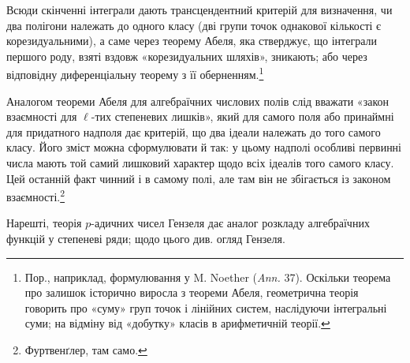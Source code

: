\documentclass[11pt]{article}
\begin{document}
Всюди скінченні інтеграли дають трансцендентний критерій для визначення, чи два полігони належать до одного класу (дві групи точок однакової кількості є корезидуальними), а саме через теорему Абеля, яка стверджує, що інтеграли першого роду, взяті вздовж «корезидуальних шляхів», зникають; або через відповідну диференціальну теорему з її оберненням.\footnote{Пор., наприклад, формулювання у M. Noether (\emph{Ann.} 37). Оскільки теорема про залишок історично виросла з теореми Абеля, геометрична теорія говорить про «суму» груп точок і лінійних систем, наслідуючи інтегральні суми; на відміну від «добутку» класів в арифметичній теорії.}

Аналогом теореми Абеля для алгебраїчних числових полів слід вважати «закон взаємності для \(\ell\)-тих степеневих лишків», який для самого поля або принаймні для придатного надполя дає критерій, що два ідеали належать до того самого класу. Його зміст можна сформулювати й так: у цьому надполі особливі первинні числа мають той самий лишковий характер щодо всіх ідеалів того самого класу. Цей останній факт чинний і в самому полі, але там він не збігається із законом взаємності.\footnote{Фуртвенґлер, там само.}

Нарешті, теорія \(p\)-адичних чисел Гензеля дає аналог розкладу алгебраїчних функцій у степеневі ряди; щодо цього див. огляд Гензеля.
\end{document}
